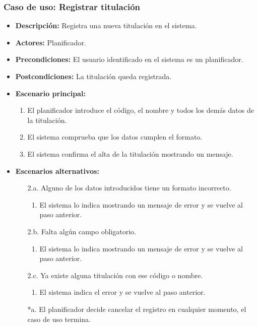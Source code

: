 \subsubsection*{Caso de uso: Registrar titulación}
\begin{itemize}
\item{\bf Descripción:} Registra una nueva titulación en el sistema.
\item{\bf Actores:} Planificador.
\item{\bf Precondiciones:} El usuario identificado en el sistema es un planificador.
\item{\bf Postcondiciones:} La titulación queda registrada.
\item{\bf Escenario principal:}
\begin{enumerate}
\item El planificador introduce el código, el nombre y todos los demás datos de la titulación.
\item El sistema comprueba que los datos cumplen el formato.
\item El sistema confirma el alta de la titulación mostrando un mensaje.
\end{enumerate}
\item{\bf Escenarios alternativos:}
	\begin{itemize}
	\item[2.a.] Alguno de los datos introducidos tiene un formato incorrecto.
		\begin{enumerate}
		\item El sistema lo indica mostrando un mensaje de error y se vuelve al paso anterior.
		\end{enumerate}
	\item[2.b.] Falta algún campo obligatorio.
		\begin{enumerate}
		\item El sistema lo indica mostrando un mensaje de error y se vuelve al paso anterior.
		\end{enumerate}
	\item[2.c.] Ya existe alguna titulación con ese código o nombre.
		\begin{enumerate}
		\item El sistema indica el error y se vuelve al paso anterior.
		\end{enumerate}
	\item[*a.] El planificador decide cancelar el registro en cualquier momento, el caso de uso termina. 
	\end{itemize}
\end{itemize}



